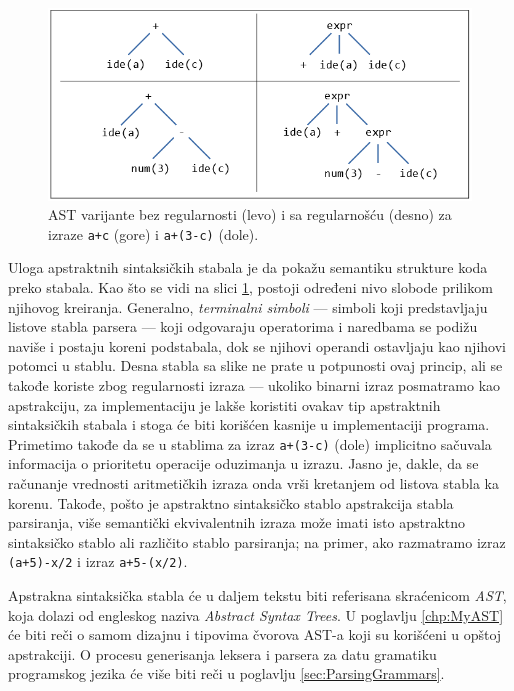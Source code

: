 \begin{figure}[h!]
\centering
\includegraphics[scale=0.7]{images/ast.png}
\caption{AST varijante bez regularnosti (levo) i sa regularnošću (desno) za izraze \texttt{a+c} (gore) i \texttt{a+(3-c)} (dole).} 
\label{fig:ASTVariants}
\end{figure}

Uloga apstraktnih sintaksičkih stabala \cite{FormalSyntaxAndSemantics} je da pokažu semantiku strukture koda preko stabala. Kao što se vidi na slici \ref{fig:ASTVariants}, postoji određeni nivo slobode prilikom njihovog kreiranja. Generalno, \emph{terminalni simboli} --- simboli koji predstavljaju listove stabla parsera --- koji odgovaraju operatorima i naredbama se podižu naviše i postaju koreni podstabala, dok se njihovi operandi ostavljaju kao njihovi potomci u stablu. Desna stabla sa slike ne prate u potpunosti ovaj princip, ali se takođe koriste zbog regularnosti izraza --- ukoliko binarni izraz posmatramo kao apstrakciju, za implementaciju je lakše koristiti ovakav tip apstraktnih sintaksičkih stabala i stoga će biti korišćen kasnije u implementaciji programa. Primetimo takođe da se u stablima za izraz \texttt{a+(3-c)} (dole) implicitno sačuvala informacija o prioritetu operacije oduzimanja u izrazu. Jasno je, dakle, da se računanje vrednosti aritmetičkih izraza onda vrši kretanjem od listova stabla ka korenu. Takođe, pošto je apstraktno sintaksičko stablo apstrakcija stabla parsiranja, više semantički ekvivalentnih izraza može imati isto apstraktno sintaksičko stablo ali različito stablo parsiranja; na primer, ako razmatramo izraz \texttt{(a+5)-x/2} i izraz \texttt{a+5-(x/2)}.

Apstrakna sintaksička stabla će u daljem tekstu biti referisana skraćenicom \emph{AST}, koja dolazi od engleskog naziva \emph{Abstract Syntax Trees}. U poglavlju \ref{chp:MyAST} će biti reči o samom dizajnu i tipovima čvorova AST-a koji su korišćeni u opštoj apstrakciji. O procesu generisanja leksera i parsera za datu gramatiku programskog jezika će više biti reči u poglavlju \ref{sec:ParsingGrammars}.
